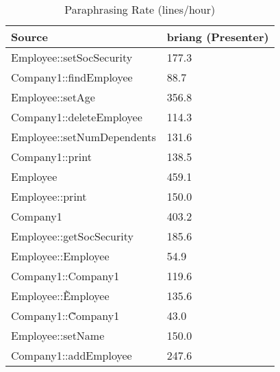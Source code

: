 \begin{table}[hb]
\begin{center}
\begin{tabular}{|l|l|}
\hline
Source & briang (Presenter)\\
\hline
Employee::setSocSecurity & 177.3\\
Company1::findEmployee & 88.7\\
Employee::setAge & 356.8\\
Company1::deleteEmployee & 114.3\\
Employee::setNumDependents & 131.6\\
Company1::print & 138.5\\
Employee & 459.1\\
Employee::print & 150.0\\
Company1 & 403.2\\
Employee::getSocSecurity & 185.6\\
Employee::Employee & 54.9\\
Company1::Company1 & 119.6\\
Employee::\~Employee & 135.6\\
Company1::\~Company1 & 43.0\\
Employee::setName & 150.0\\
Company1::addEmployee & 247.6\\
\hline
\end{tabular}
\end{center}
\caption{Paraphrasing Rate (lines/hour)}
\end{table}

